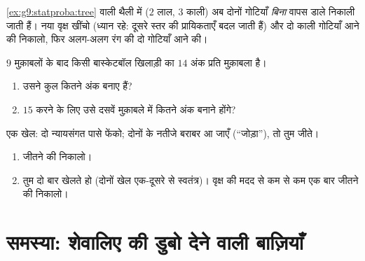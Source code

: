 \begin{exercise}[$\star\star$]\label{exo:g9:statproba:7}
\cref{ex:g9:statproba:tree} वाली थैली में ($2$ लाल, $3$ काली) अब
दोनों गोटियाँ \emph{बिना} वापस डाले निकाली जाती हैं। नया वृक्ष खींचो
(ध्यान रहे: दूसरे स्तर की प्रायिकताएँ बदल जाती हैं) और दो काली
गोटियाँ आने की  निकालो, फिर अलग-अलग रंग की दो गोटियाँ आने
की।
\end{exercise}

\begin{exercise}[$\star\star$]\label{exo:g9:statproba:8}
$9$ मुक़ाबलों के बाद किसी बास्केटबॉल खिलाड़ी का  $14$ अंक प्रति
मुक़ाबला है।
\begin{enumerate}
  \item उसने कुल कितने अंक बनाए हैं?
  \item {} $15$ करने के लिए उसे दसवें मुक़ाबले में कितने अंक
        बनाने होंगे?
\end{enumerate}
\end{exercise}

\begin{exercise}[$\star\star\star$]\label{exo:g9:statproba:9}
एक खेल: दो न्यायसंगत पासे फेंको; दोनों के नतीजे बराबर आ जाएँ
(``जोड़ा''), तो तुम जीते।
\begin{enumerate}
  \item जीतने की  निकालो।
  \item तुम दो बार खेलते हो (दोनों खेल एक-दूसरे से स्वतंत्र)। वृक्ष
        की मदद से कम से कम एक बार जीतने की  निकालो।
\end{enumerate}
\end{exercise}

\section{समस्या: शेवालिए की डुबो देने वाली बाज़ियाँ}

